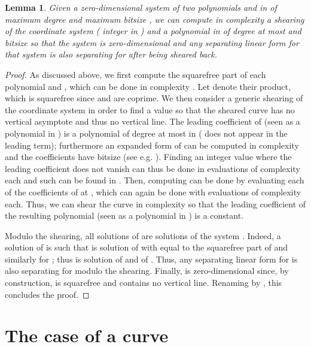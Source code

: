 \documentclass{sig-alternate}
\newtheorem{lemma}[theorem]{Lemma}
\newcommand{\blue}[1]{\color{blue}#1\color{black}\xspace}
\renewcommand{\blue}[1]{#1\xspace}
\begin{document}
\begin{lemma}
\label{lem:system2curve}
Given a zero-dimensional system of two polynomials  and  in  of maximum degree  and maximum
bitsize , we can compute in complexity  a \blue{shearing} of the coordinate system
 ( integer in ) and a polynomial  in  of degree at most  and bitsize   so
that the system  is zero-dimensional and any separating linear
form for that system is also separating for  after being sheared back. 
\end{lemma}
\begin{proof}
As discussed above, we  first compute the squarefree part of \blue{each polynomial  and }, which can be
done in complexity  \cite[Lemma 13]{sagraloff2013}. \blue{Let  denote
  their product, which is squarefree since  and  are coprime.}
We then consider a generic \blue{shearing} of the
coordinate system  in order to find a value  so that the sheared
curve  has no vertical asymptote \blue{ and thus no
vertical line.}
The leading coefficient of  (seen as a polynomial in ) is a polynomial of degree at
most  in  ( does not appear in the leading
term); furthermore an expanded form of   can  be computed in complexity
 and the coefficients have 
bitsize  (see e.g. \blue{\cite[Lemma 7]{bouzidiJSC2014a}}). Finding an integer value  where the leading coefficient does not vanish can thus be done in 
evaluations of complexity  each \blue{\cite[Lemma 6]{bouzidiJSC2014a}} and such   can be found in \blue{ }. Then, computing    can be done by evaluating
each of the coefficients of  at , which can again be done with 
evaluations of  complexity  each. 
Thus, we can shear the curve in complexity  so that the leading coefficient of the resulting polynomial  (seen
as a polynomial in ) is a constant.


Modulo the \blue{shearing}, all solutions of  are solutions of the system . Indeed, a solution  of  is such that
 is solution of  with
 equal to the squarefree part of  and similarly for
; thus  is solution of  and of . Thus, any separating linear form for   is also separating for  modulo the \blue{shearing}. Finally,  is zero-dimensional since, by construction,
 is squarefree and contains no vertical
line.
Renaming  by , this concludes the proof.
\end{proof}


\section{The case of a curve}
\label{sec:curve}
\end{document}
